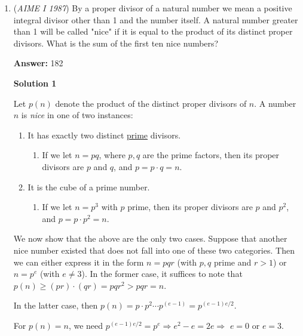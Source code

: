 \begin{enumerate}
 


	\item (\textit{AIME I 1987}) By a proper divisor of a natural number we mean a positive integral divisor other than 1 and the number itself. A natural number greater than 1 will be called "nice" if it is equal to the product of its distinct proper divisors. What is the sum of the first ten nice numbers?


 
 \textbf{Answer: }182



\textbf{Solution 1}

Let $p(n)$ denote the product of the distinct proper divisors of $n$. A number $n$ is \textit{nice} in one of two instances: 

 
            \begin{enumerate}
        \item It has exactly two distinct \href{https://artofproblemsolving.com/wiki/index.php?title=Prime}{prime} divisors.
            \begin{enumerate}[label=(\roman*)]
                \item If we let $n = pq$, where $p,q$ are the prime factors, then its proper divisors are $p$ and $q$, and $p = p \cdot q = n$.
            \end{enumerate}
            
        \item It is the cube of a prime number.
            \begin{enumerate}[label=(\roman*)]
                \item If we let $n=p^3$ with $p$ prime, then its proper divisors are $p$ and $p^2$, and $p = p \cdot p^2 =n$.
            \end{enumerate}
            
            \end{enumerate}
            We now show that the above are the only two cases. Suppose that another nice number existed that does not fall into one of these two categories. Then we can either express it in the form $n = pqr$ (with $p,q$ prime and $r > 1$) or $n = p^e$ (with $e \neq 3$). In the former case, it suffices to note that $p(n) \ge (pr) \cdot (qr) = pqr^2 > pqr = n$. 

 In the latter case, then $p(n) = p \cdot p^2 \cdots p^{(e-1)} = p^{(e-1)e/2}$.

 For $p(n) = n$, we need $p^{(e-1)e/2} = p^e \Longrightarrow e^2 - e = 2e \Longrightarrow$ $e = 0$ or $e = 3$.  


\end{enumerate}

